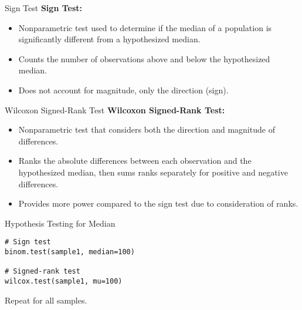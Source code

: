 \documentclass{beamer}
\begin{document}
\begin{frame}{Sign Test }
\textbf{Sign Test:}
\begin{itemize}
    \item Nonparametric test used to determine if the median of a population is significantly different from a hypothesized median.
    \item Counts the number of observations above and below the hypothesized median.
    \item Does not account for magnitude, only the direction (sign).
\end{itemize}
\end{frame}
\begin{frame}{ Wilcoxon Signed-Rank Test}
\textbf{Wilcoxon Signed-Rank Test:}
\begin{itemize}
    \item Nonparametric test that considers both the direction and magnitude of differences.
    \item Ranks the absolute differences between each observation and the hypothesized median, then sums ranks separately for positive and negative differences.
    \item Provides more power compared to the sign test due to consideration of ranks.
\end{itemize}
\end{frame}
\begin{frame}[fragile]{Hypothesis Testing for Median}
\begin{verbatim}
# Sign test
binom.test(sample1, median=100)

# Signed-rank test
wilcox.test(sample1, mu=100)
\end{verbatim}
Repeat for all samples.
\end{frame}
\end{document}
